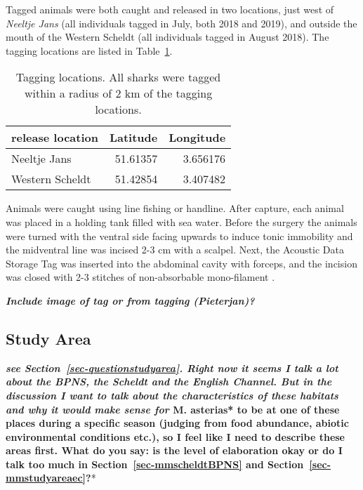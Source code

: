 \documentclass[
  authoryear,
  review,
  3p]{elsarticle}
\begin{document}
Tagged animals were both caught and released in two locations, just west
of \emph{Neeltje Jans} (all individuals tagged in July, both 2018 and
2019), and outside the mouth of the Western Scheldt (all individuals
tagged in August 2018). The tagging locations are listed in
Table~\ref{tbl-releaseloc}.

\hypertarget{tbl-releaseloc}{}
\begin{table}[H]
\caption{\label{tbl-releaseloc}Tagging locations. All sharks were tagged within a radius of 2 km of the
tagging locations. }\tabularnewline

\centering
\begin{tabular}{l|r|r}
\hline
release location & Latitude & Longitude\\
\hline
Neeltje Jans & 51.61357 & 3.656176\\
\hline
Western Scheldt & 51.42854 & 3.407482\\
\hline
\end{tabular}
\end{table}

Animals were caught using line fishing or handline. After capture, each
animal was placed in a holding tank filled with sea water. Before the
surgery the animals were turned with the ventral side facing upwards to
induce tonic immobility \citep{kessel_2015} and the midventral line was
incised 2-3 cm with a scalpel. Next, the Acoustic Data Storage Tag was
inserted into the abdominal cavity with forceps, and the incision was
closed with 2-3 stitches of non-absorbable mono-filament
\citep{goossens_2023}.

\textbf{\emph{Include image of tag or from tagging (Pieterjan)?}}

\hypertarget{sec-mm_studyarea}{%
\subsection{Study Area}\label{sec-mm_studyarea}}

\textbf{\emph{see Section~\ref{sec-questionstudyarea}. Right now it
seems I talk a lot about the BPNS, the Scheldt and the English Channel.
But in the discussion I want to talk about the characteristics of these
habitats and why it would make sense for }M. asterias* to be at one of
these places during a specific season (judging from food abundance,
abiotic environmental conditions etc.), so I feel like I need to
describe these areas first. What do you say: is the level of elaboration
okay or do I talk too much in Section~\ref{sec-mmscheldtBPNS} and
Section~\ref{sec-mmstudyareaec}?}*
\end{document}
